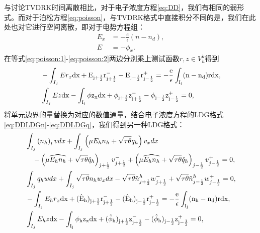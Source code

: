 与讨论TVDRK时间离散相比，对于电子浓度方程\eqref{eq:DD}，我们有相同的弱形式。而对于泊松方程\eqref{eq:poisson}，与TVDRK格式中直接积分不同的是，我们在此处也对它进行空间离散，即对于电势方程组：
\begin{align}
    E_x & = -\frac{e}{\epsilon}(n-n_d), \label{eq:poisson:1} \\
    E   & = - \phi_x. \label{eq:poisson:2}
\end{align}
在等式\eqref{eq:poisson:1}-\eqref{eq:poisson:2}两边分别乘上测试函数$r,z\in V^k_h$得到
\begin{align}
     & -\int_{I_j}Er_x\rm{d}x + E_{j+\frac{1}{2}}r_{j+\frac{1}{2}}^- - E_{j-\frac{1}{2}}r_{j-\frac{1}{2}}^+ = -\frac{e}{\epsilon}\int_{I_j}(n-n_d)r\rm{d}x,                                       \label{DD:weakform:E} \\
     & \int_{I_j} Ez \rm{d}x - \int_{I_j}\phi z_x \rm{d}x + \phi_{j+\frac{1}{2}}z_{j+\frac{1}{2}}^- - \phi_{j-\frac{1}{2}}z_{j-\frac{1}{2}}^+ = 0, \label{DD:weakform:phi}
\end{align}
将单元边界的量替换为对应的数值通量，结合电子浓度方程的LDG格式\eqref{eq:DDLDGn}-\eqref{eq:DDLDGq}，我们得到另一种LDG格式：
\begin{align}
     & \int_{I_{j}}\left(n_h\right)_{t} v d x+\int_{I_{j}}\left(\mu E_h n_h+\sqrt{\tau \theta} q_h\right) v_{x} d x      \nonumber                                                                                                                       \\
     & \quad-\left(\mu \widehat{E_h n_h}+\sqrt{\tau \theta} \hat{q}_{h}\right)_{j+\frac{1}{2}} v_{j+\frac{1}{2}}^{-}+\left(\mu \widehat{E_h n_h}+\sqrt{\tau \theta} \hat{q}_{h}\right)_{j-\frac{1}{2}} v_{j-\frac{1}{2}}^{+}=0, \label{eq:IMEX:DD:n}     \\
     & \int_{I_{j}} q_h w d x+\int_{I_{j}} \sqrt{\tau \theta} n_h w_{x} d x-\sqrt{\tau \theta} \hat{n}_{j+\frac{1}{2}}^{h} w_{j+\frac{1}{2}}^{-}+\sqrt{\tau \theta} \hat{n}_{j-\frac{1}{2}}^{h} w_{j-\frac{1}{2}}^{+}=0,            \label{eq:IMEX:DD:q} \\
     & -\int_{I_j}E_hr_x\rm{d}x + (\hat{E}_h)_{j+\frac{1}{2}}r_{j+\frac{1}{2}}^- - (\hat{E}_h)_{j-\frac{1}{2}}r_{j-\frac{1}{2}}^+ = -\frac{e}{\epsilon}\int_{I_j}(n_h-n_d)r\rm{d}x,                                        \label{eq:IMEX:poisson:1}     \\
     & \int_{I_j} E_hz \rm{d}x - \int_{I_j}\phi_h z_x \rm{d}x + (\hat{\phi}_h)_{j+\frac{1}{2}}z_{j+\frac{1}{2}}^- - (\hat{\phi}_h)_{j-\frac{1}{2}}z_{j-\frac{1}{2}}^+ = 0,\label{eq:IMEX:poisson:2}
\end{align}
